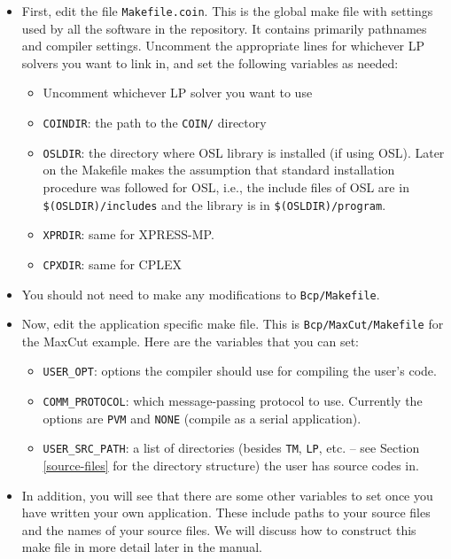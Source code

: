 \begin{itemize}
\item First, edit the file {\tt Makefile.coin}. This is
  the global make file with settings used by all the software in the
  repository. It contains primarily pathnames and compiler settings.
  Uncomment the appropriate lines for whichever LP solvers you want to
  link in, and set the following variables as needed:
  \begin{itemize}
  \item Uncomment whichever LP solver you want to use
  \item {\tt COINDIR}: the path to the {\tt COIN/} directory
  \item {\tt OSLDIR}: the directory where OSL library is installed (if
    using OSL). Later on the Makefile makes the assumption that standard
    installation procedure was followed for OSL, i.e., the include files 
    of OSL are in {\tt \$(OSLDIR)/includes} and the library is in 
    {\tt \$(OSLDIR)/program}.
  \item {\tt XPRDIR}: same for XPRESS-MP. 
  \item {\tt CPXDIR}: same for CPLEX
  \end{itemize}
\item You should not need to make any modifications to 
  {\tt Bcp/Makefile}. 
\item Now, edit the application specific make file. This
  is {\tt Bcp/MaxCut/Makefile} for the MaxCut example. Here are the variables
  that you can set:
  \begin{itemize}
  \item {\tt USER\_OPT}: options the compiler should use
    for compiling the user's code.
  \item {\tt COMM\_PROTOCOL}: which message-passing
    protocol to use. Currently the options are {\tt PVM} and {\tt NONE}
    (compile as a serial application). 
  \item {\tt USER\_SRC\_PATH}: a list of directories (besides {\tt TM}, 
    {\tt LP}, etc. -- see Section \ref{source-files} for the directory
    structure) the user has source codes in.
  \end{itemize}
\item In addition, you will see that there are some other
  variables to set once you have written your own application. These
  include paths to your source files and the names of your source files.
  We will discuss how to construct this make file in more detail later
  in the manual. 
\end{itemize}
        
